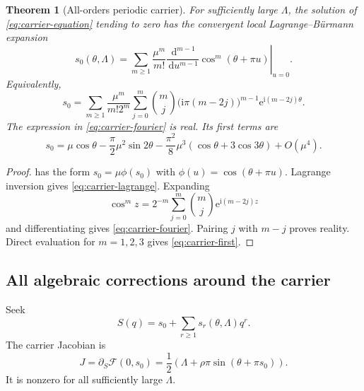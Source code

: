 \documentclass[11pt,oneside]{article}
\theoremstyle{plain}
\newtheorem{theorem}{Theorem}[section]
\theoremstyle{definition}
\theoremstyle{remark}
\newcommand{\e}{\mathrm e}
\newcommand{\ii}{\mathrm i}
\newcommand{\dd}{\,\mathrm d}
\begin{document}
\begin{theorem}[All-orders periodic carrier]
\label{thm:periodic-carrier}
For sufficiently large \(\Lambda\), the solution of
\cref{eq:carrier-equation} tending to zero has the convergent local
Lagrange--B\"urmann expansion
\begin{equation}
 \boxed{
 s_0(\theta,\Lambda)
 =\sum_{m\ge1}\frac{\mu^m}{m!}
 \left.\frac{\dd^{m-1}}{\dd u^{m-1}}
 \cos^m(\theta+\pi u)\right|_{u=0}.}
 \label{eq:carrier-lagrange}
\end{equation}
Equivalently,
\begin{equation}
 s_0
 =\sum_{m\ge1}\frac{\mu^m}{m!2^m}
 \sum_{j=0}^{m}\binom mj
 \bigl(\ii\pi(m-2j)\bigr)^{m-1}
 \e^{\ii(m-2j)\theta}.
 \label{eq:carrier-fourier}
\end{equation}
The expression in \cref{eq:carrier-fourier} is real.  Its first terms are
\begin{equation}
 s_0=\mu\cos\theta
 -\frac\pi2\mu^2\sin2\theta
 -\frac{\pi^2}{8}\mu^3(\cos\theta+3\cos3\theta)
 +O(\mu^4).
 \label{eq:carrier-first}
\end{equation}
\end{theorem}

\begin{proof}
 has the form
\(s_0=\mu\phi(s_0)\) with \(\phi(u)=\cos(\theta+\pi u)\).  Lagrange inversion
gives \cref{eq:carrier-lagrange}.  Expanding
\[
 \cos^m z=2^{-m}\sum_{j=0}^m\binom mj\e^{\ii(m-2j)z}
\]
and differentiating gives \cref{eq:carrier-fourier}.  Pairing \(j\) with
\(m-j\) proves reality.  Direct evaluation for \(m=1,2,3\) gives
\cref{eq:carrier-first}.
\end{proof}

\subsection{All algebraic corrections around the carrier}

Seek
\begin{equation}
 S(q)=s_0+\sum_{r\ge1}s_r(\theta,\Lambda)q^r.
 \label{eq:S-series}
\end{equation}
The carrier Jacobian is
\begin{equation}
 J=\partial_S\mathcal F(0,s_0)
 =\frac12\left(\Lambda+\rho\pi\sin(\theta+\pi s_0)\right).
 \label{eq:J}
\end{equation}
It is nonzero for all sufficiently large \(\Lambda\).
\end{document}
